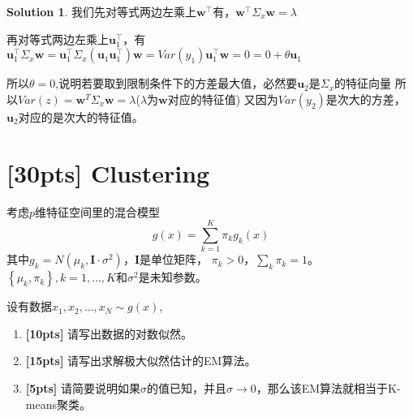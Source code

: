 \documentclass[a4paper,UTF8]{article}
\theoremstyle{definition}
\newtheorem*{solution}{Solution}
\begin{document}
\begin{solution}
	我们先对等式两边左乘上$\boldsymbol{w}^{\top}$有，$\boldsymbol{w}^{\top}\Sigma_{x}\boldsymbol{w}=\lambda$ 


	再对等式两边左乘上$\boldsymbol{u}_1^{\top}$，有$\boldsymbol{u}_1^{\top}\Sigma_{x}\boldsymbol{w}=\boldsymbol{u}_1^{\top}\Sigma_{x}(\boldsymbol{u}_1\boldsymbol{u}_1^{\top})\boldsymbol{w}=Var(y_1)\boldsymbol{u}_1^{\top}\boldsymbol{w}=0=0+\theta\boldsymbol{u}_1$

	所以$\theta=0$,说明若要取到限制条件下的方差最大值，必然要$\boldsymbol{u}_2$是$\Sigma_{x}$的特征向量 所以$Var(z)={\boldsymbol{w}}^T\Sigma_{x}{\boldsymbol{w}}=\lambda$($\lambda$为$\boldsymbol{w}$对应的特征值) 又因为$Var(y_2)$是次大的方差，$\boldsymbol{u}_2$对应的是次大的特征值。

\end{solution}

\section{[30pts] Clustering}
考虑$p$维特征空间里的混合模型
$$
g(x)=\sum_{k=1}^{K} \pi_{k} g_{k}(x)
$$
其中$g_{k}=N\left(\mu_{k}, \mathbf{I} \cdot \sigma^{2}\right)$，$\mathbf{I}$是单位矩阵，
$\pi_{k} > 0$，$\sum_{k} \pi_{k}=1$。
$\left\{\mu_{k}, \pi_{k}\right\}, k=1,\ldots,K$和$\sigma^2$是未知参数。

设有数据$x_{1}, x_{2}, \ldots, x_{N} \sim g(x)$,
\begin{enumerate}
	\item \textbf{[10pts]} 请写出数据的对数似然。
	\item \textbf{[15pts]} 请写出求解极大似然估计的EM算法。
	\item \textbf{[5pts]} 请简要说明如果$\sigma$的值已知，并且$\sigma \rightarrow 0$，那么该EM算法就相当于K-means聚类。
\end{enumerate}
\end{document}
